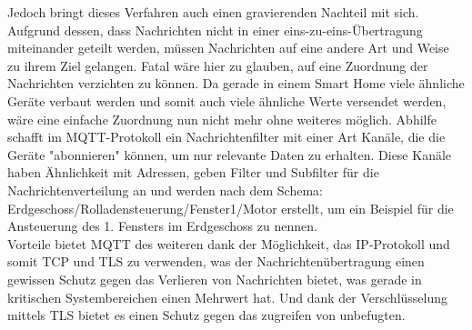 Jedoch bringt dieses Verfahren auch einen gravierenden Nachteil mit sich. Aufgrund dessen, dass Nachrichten nicht in einer eins-zu-eins-Übertragung miteinander geteilt werden, müssen Nachrichten auf eine andere Art und Weise zu ihrem Ziel gelangen. Fatal wäre hier zu glauben, auf eine Zuordnung der Nachrichten verzichten zu können. Da gerade in einem Smart Home viele ähnliche Geräte verbaut werden und somit auch viele ähnliche Werte versendet werden, wäre eine einfache Zuordnung nun nicht mehr ohne weiteres möglich.
Abhilfe schafft im MQTT-Protokoll ein Nachrichtenfilter mit einer Art Kanäle, die die Geräte "abonnieren" können, um nur relevante Daten zu erhalten\cite{b1}. Diese Kanäle haben Ähnlichkeit mit Adressen, geben Filter und Subfilter für die Nachrichtenverteilung an und werden nach dem Schema: \textsf{Erdgeschoss/Rolladensteuerung/Fenster1/Motor} erstellt, um ein Beispiel für die Ansteuerung des 1. Fensters im Erdgeschoss zu nennen. \\
Vorteile bietet MQTT des weiteren dank der Möglichkeit, das IP-Protokoll und somit TCP und TLS zu verwenden, was der Nachrichtenübertragung einen gewissen Schutz gegen das Verlieren von Nachrichten bietet, was gerade in kritischen Systembereichen einen Mehrwert hat. Und dank der Verschlüsselung mittels TLS bietet es einen Schutz gegen das zugreifen von unbefugten.